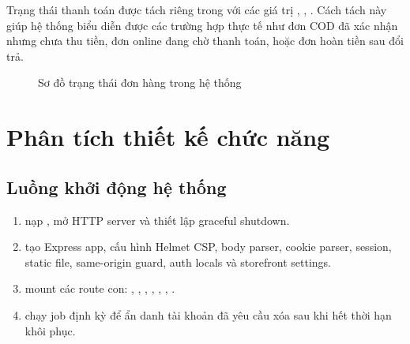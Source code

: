 \documentclass[12pt,a4paper]{report}
\begin{document}
Trạng thái thanh toán được tách riêng trong  với các giá trị , , . Cách tách này giúp hệ thống biểu diễn được các trường hợp thực tế như đơn COD đã xác nhận nhưng chưa thu tiền, đơn online đang chờ thanh toán, hoặc đơn hoàn tiền sau đổi trả.

\begin{figure}[H]
    \centering
    \caption{Sơ đồ trạng thái đơn hàng trong hệ thống}
    \label{fig:order-status}
\end{figure}

\section{Phân tích thiết kế chức năng}

\subsection{Luồng khởi động hệ thống}

\begin{enumerate}
    \item {} nạp , mở HTTP server và thiết lập graceful shutdown.
    \item {} tạo Express app, cấu hình Helmet CSP, body parser, cookie parser, session, static file, same-origin guard, auth locals và storefront settings.
    \item {} mount các route con: , , , , , , .
    \item {} chạy job định kỳ để ẩn danh tài khoản đã yêu cầu xóa sau khi hết thời hạn khôi phục.
\end{enumerate}
\end{document}
